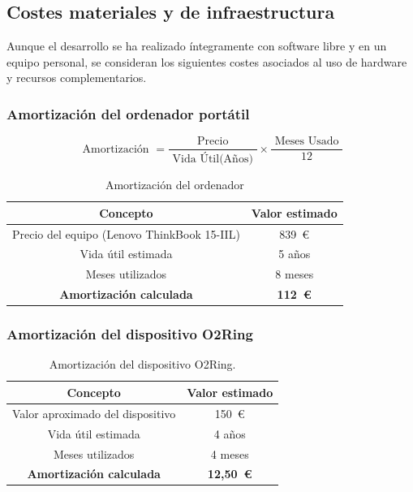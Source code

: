 \subsection{Costes materiales y de infraestructura}

Aunque el desarrollo se ha realizado íntegramente con software libre y en un equipo personal, se consideran los siguientes costes asociados al uso de hardware y recursos complementarios.

\subsubsection{Amortización del ordenador portátil}

\begin{equation}
    \text { Amortización }=\frac{\text { Precio }}{\text { Vida Útil(Años) }} \times \frac{\text { Meses Usado }}{12}
\end{equation}
\begin{table}[H]
\centering
\begin{tabular}{|c|c|}
\hline
\textbf{Concepto} & \textbf{Valor estimado} \\
\hline
Precio del equipo (Lenovo ThinkBook 15-IIL) & 839~€ \\
Vida útil estimada & 5 años \\
Meses utilizados & 8 meses \\
\textbf{Amortización calculada} & \textbf{112~€} \\
\hline
\end{tabular}
\caption{Amortización del ordenador}
\end{table}

\subsubsection{Amortización del dispositivo O2Ring}

\begin{table}[H]
\centering
\begin{tabular}{|c|c|}
\hline
\textbf{Concepto} & \textbf{Valor estimado} \\
\hline
Valor aproximado del dispositivo & 150~€ \\
Vida útil estimada & 4 años \\
Meses utilizados & 4 meses \\
\textbf{Amortización calculada} & \textbf{12,50~€} \\
\hline
\end{tabular}
\caption{Amortización del dispositivo O2Ring.}
\end{table}


